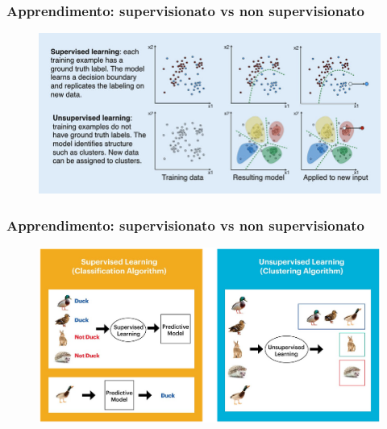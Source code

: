 \begin{frame}

	\frametitle{Apprendimento: supervisionato vs non supervisionato}

	\begin{block}{}
		\begin{figure}[!htbp]
			\centering
			\includegraphics[width=12cm]{images/glossary/supervised_vs_unsupervised_1.png}
		\end{figure}

	\end{block}

\end{frame}


\begin{frame}

	\frametitle{Apprendimento: supervisionato vs non supervisionato}

	\begin{block}{}
		\begin{figure}[!htbp]
			\centering
			\includegraphics[width=12cm]{images/glossary/supervised_vs_unsupervised_2.png}
		\end{figure}

	\end{block}

\end{frame}


